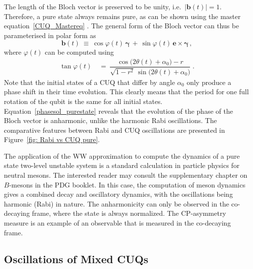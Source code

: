 \documentclass[12pt,a4paper]{article}
\begin{document}
The length of the Bloch vector is preserved to be unity, i.e.~$|\mathbf{b}(t)| = 1$. Therefore, a pure state always remains pure, as can be shown using the master equation~\eqref{CUQ_Mastereq} \cite{Karamitros:2022oew}. The general form of the Bloch vector can thus be parameterised in polar form as
\begin{equation}
    \mathbf{b}(t)\: \equiv\: \cos{\varphi(t)}\,\boldsymbol{\gamma}\, + \, \sin{\varphi(t)}\,\mathbf{e\times}\boldsymbol{\gamma}\label{purestate}\,,
\end{equation}
where $\varphi(t)$ can be computed using
\begin{equation}
    \begin{aligned}
        \tan{\varphi(t)}\: & =\: \dfrac{\cos{\big(2\theta(t) +\alpha_0\big)} - r}{\sqrt{1-r^2}\,\sin{\big(2\theta(t)+\alpha_0\big)}}\; .
    \end{aligned}
    \label{phasesol_purestate}
\end{equation}
Note that the initial states of a CUQ that differ by angle $\alpha_0$ only produce a phase shift in their time evolution. This clearly means that the period for one full rotation of the qubit is the same for all initial states. Equation~\eqref{phasesol_purestate} reveals that the evolution of the phase of the Bloch vector is anharmonic, unlike the harmonic Rabi oscillations. The comparative features between Rabi and CUQ oscillations are presented in Figure~\ref{fig: Rabi vs CUQ pure}.

The application of the WW approximation to compute the dynamics of a pure state two-level unstable system is a standard calculation in particle physics for neutral mesons. The interested reader may consult the supplementary chapter on $B$-mesons in the PDG booklet\cite{ParticleDataGroup:2024cfk}. In this case, the computation of meson dynamics gives a combined decay and oscillatory dynamics, with the oscillations being harmonic (Rabi) in nature. The anharmonicity can only be observed in the co-decaying frame, where the state is always normalized. The CP-asymmetry measure\cite{Karamitros:2025azy,Alok:2024amd} is an example of an observable that is measured in the co-decaying frame.

\subsection{Oscillations of Mixed CUQs}
\end{document}
